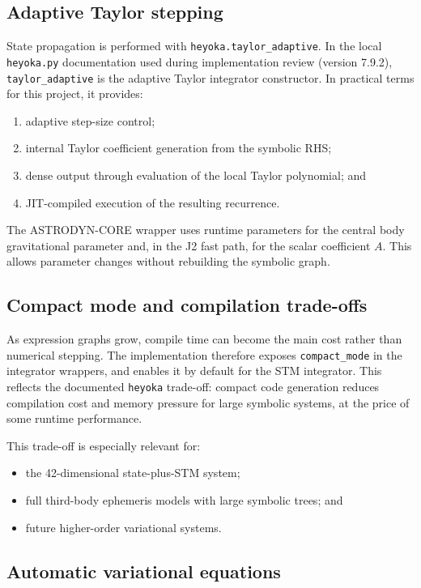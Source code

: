 \documentclass[11pt]{article}
\begin{document}
\subsection{Adaptive Taylor stepping}

State propagation is performed with \texttt{heyoka.taylor\_adaptive}. In the
local \texttt{heyoka.py} documentation used during implementation review
(version 7.9.2), \texttt{taylor\_adaptive} is the adaptive Taylor integrator
constructor. In practical terms for this project, it provides:
\begin{enumerate}
    \item adaptive step-size control;
    \item internal Taylor coefficient generation from the symbolic RHS;
    \item dense output through evaluation of the local Taylor polynomial; and
    \item JIT-compiled execution of the resulting recurrence.
\end{enumerate}

The ASTRODYN-CORE wrapper uses runtime parameters for the central body
gravitational parameter and, in the J2 fast path, for the scalar coefficient
$A$. This allows parameter changes without rebuilding the symbolic graph.

\subsection{Compact mode and compilation trade-offs}

As expression graphs grow, compile time can become the main cost rather than
numerical stepping. The implementation therefore exposes \texttt{compact\_mode}
in the integrator wrappers, and enables it by default for the STM integrator.
This reflects the documented \texttt{heyoka} trade-off: compact code generation
reduces compilation cost and memory pressure for large symbolic systems, at the
price of some runtime performance.

This trade-off is especially relevant for:
\begin{itemize}
    \item the 42-dimensional state-plus-STM system;
    \item full third-body ephemeris models with large symbolic trees; and
    \item future higher-order variational systems.
\end{itemize}

\subsection{Automatic variational equations}
\end{document}
